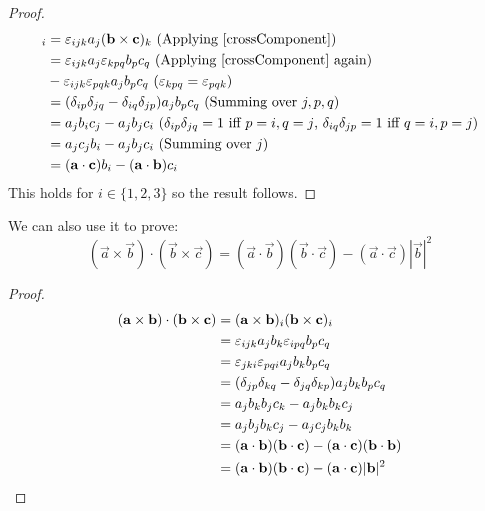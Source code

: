 \documentclass[../main.tex]{subfiles}
\begin{document}
\begin{proof}
  \begin{align*}
    [\vec{a} \times (\vec{b} \times \vec{c})]_i &= \levi_{ijk} a_j (\vec{b} \times \vec{c})_k \text{ (Applying \cref{crossComponent})} \\
                                                &= \levi_{ijk} a_j \levi_{kpq} b_p c_q \text{ (Applying \cref{crossComponent} again)}\\
                                                &- \levi_{ijk} \levi_{pqk} a_j b_p c_q \text{ ($\levi_{k p q} = \levi_{p q k}$)}\\
                                                &= (\delta_{i p} \delta_{j q} - \delta_{i q} \delta_{j p}) a_j b_p c_q \text{ (Summing over $j, p, q$)} \\
                                                &= a_j b_i c_j - a_j b_j c_i \text{ ($\delta_{i p} \delta_{j q} = 1$ iff $p = i, q = j$, $\delta_{i q}\delta_{j p} = 1$ iff $q = i, p = j$)}\\
                                                &= a_j c_j b_i - a_j b_j c_i \text{ (Summing over $j$)}\\
                                                &= (\vec{a} \cdot \vec{c})b_i - (\vec{a} \cdot \vec{b})c_i
  \end{align*}
  This holds for $i \in \{1, 2, 3\}$ so the result follows.
\end{proof}
We can also use it to prove:
\[
  (\vec{a} \times \vec{b}) \cdot (\vec{b} \times \vec{c}) = (\vec{a} \cdot \vec{b})(\vec{b} \cdot \vec{c}) - (\vec{a} \cdot \vec{c})|\vec{b}|^2
\]
\begin{proof}
  \begin{align*}
    (\boldsymbol{\mathbf{a}} \times \boldsymbol{\mathbf{b}}) \cdot (\boldsymbol{\mathbf{b}} \times \boldsymbol{\mathbf{c}}) &= (\boldsymbol{\mathbf{a}} \times \boldsymbol{\mathbf{b}})_i (\boldsymbol{\mathbf{b}} \times \boldsymbol{\mathbf{c}})_i \\
     &= \varepsilon_{i j k} a_j b_k \varepsilon_{i p q} b_p c_q \\
     &= \varepsilon_{j k i} \varepsilon_{p q i} a_j b_k b_p c_q \\
     &= (\delta_{j p}\delta_{k q} - \delta_{j q}\delta_{k p}) a_j b_k b_p c_q \\
     &= a_j b_k b_j c_k - a_j b_k b_k c_j \\
     &= a_j b_j b_k c_j - a_j c_j b_k b_k \\
     &= (\boldsymbol{\mathbf{a}} \cdot \boldsymbol{\mathbf{b}}) (\boldsymbol{\mathbf{b}} \cdot \boldsymbol{\mathbf{c}}) - (\boldsymbol{\mathbf{a}} \cdot \boldsymbol{\mathbf{c}}) (\boldsymbol{\mathbf{b}} \cdot \boldsymbol{\mathbf{b}}) \\
     &= (\boldsymbol{\mathbf{a}} \cdot \boldsymbol{\mathbf{b}}) (\boldsymbol{\mathbf{b}} \cdot \boldsymbol{\mathbf{c}}) - (\boldsymbol{\mathbf{a}} \cdot \boldsymbol{\mathbf{c}}) |\boldsymbol{\mathbf{b}}|^2
  \end{align*}
\end{proof}
\end{document}
